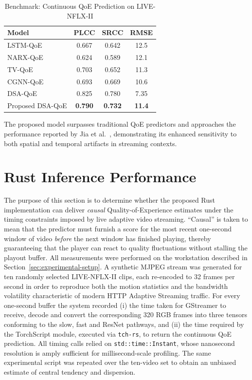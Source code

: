 \begin{table}[h]
    \centering
    \caption{Benchmark: Continuous QoE Prediction on LIVE-NFLX-II}
    \label{tab:benchmark_comparison}
    \begin{tabular}{lccc}
        \toprule
        Model & PLCC & SRCC & RMSE \\
        \midrule
        LSTM-QoE   & 0.667 & 0.642 & 12.5 \\
        NARX-QoE   & 0.624 & 0.589 & 12.1 \\
        TV-QoE     & 0.703 & 0.652 & 11.3 \\
        CGNN-QoE   & 0.693 & 0.669 & 10.6 \\
        DSA-QoE~\cite{jia2024continuous} & 0.825 & 0.780 & 7.35 \\
        Proposed DSA-QoE & \textbf{0.790} & \textbf{0.732} & \textbf{11.4} \\
        \bottomrule
    \end{tabular}
\end{table}

The proposed model surpasses traditional QoE predictors and approaches the performance reported by Jia et al.~\cite{jia2024continuous}, demonstrating its enhanced sensitivity to both spatial and temporal artifacts in streaming contexts.

\section{Rust Inference Performance}
\label{sec:rust-performance}

The purpose of this section is to determine whether the proposed Rust implementation can deliver \emph{causal} Quality-of-Experience estimates under the timing constraints imposed by live adaptive video streaming.  
“Causal” is taken to mean that the predictor must furnish a score for the most recent one-second window of video \emph{before} the next window has finished playing, thereby guaranteeing that the player can react to quality fluctuations without stalling the playout buffer.  
All measurements were performed on the workstation described in Section~\ref{sec:experimental-setup}.  
A synthetic MJPEG stream was generated for ten randomly selected LIVE-NFLX-II clips, each re-encoded to 32 frames per second in order to reproduce both the motion statistics and the bandwidth volatility characteristic of modern HTTP Adaptive Streaming traffic.  
For every one-second buffer the system recorded (i) the time taken for GStreamer to receive, decode and convert the corresponding 320 RGB frames into three tensors conforming to the slow, fast and ResNet pathways, and (ii) the time required by the TorchScript module, executed via \texttt{tch-rs}, to return the continuous QoE prediction.  
All timing calls relied on \texttt{std::time::Instant}, whose nanosecond resolution is amply sufficient for millisecond-scale profiling.  
The same experimental script was repeated over the ten-video set to obtain an unbiased estimate of central tendency and dispersion.


